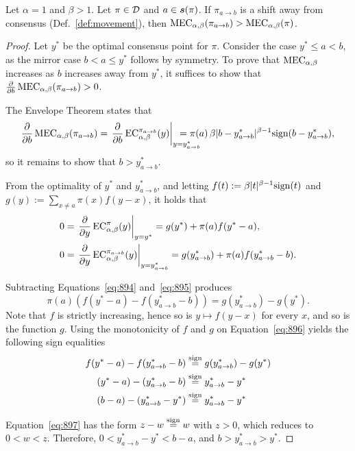 \begin{theorem}\label{thm:mec-increases-a1-b}
Let $\alpha = 1$ and $\beta>1$. Let $\pi\in\mathcal{D}$ and $a\in\boldsymbol{s}(\pi)$. If $\pi_{a\to b}$ is a shift away from consensus (Def.~\ref{def:movement}), then $\MEC(\pi_{a\to b})>\MEC(\pi)$.
\end{theorem}
\begin{proof}
Let $y^*$ be the optimal consensus point for $\pi$.
Consider the case $y^*\le a<b$, as the mirror case $b<a\le y^*$ follows by symmetry.
To prove that $\MEC$ increases as $b$ increases away from $y^*$, it suffices to show that $\frac{\partial}{\partial b} \MEC(\pi_{a\to b})>0$.

The Envelope Theorem states that
\[
\frac{\partial}{\partial b} \MEC(\pi_{a\to b})
=\left.\frac{\partial}{\partial b} \EC[\alpha,\beta][\pi_{a\to b}](y)\right|_{y=y^*_{a\to b}}\hspace{-2.5em} = \pi(a)\, \beta |b-y^*_{a\to b}|^{\beta-1} \sign(b-y^*_{a\to b}),
\]
so it remains to show that $b > y^*_{a\to b}$.

From the optimality of $y^*$ and $y^*_{a\to b}$, and letting $f(t):=\beta |t|^{\beta-1} {\textrm{sign}}(t)$ and  $g(y) := \sum_{x \ne a} \pi(x) f(y-x)$, it holds that
\begin{align}
0 &= \left.\frac{\partial}{\partial y} \EC[\alpha,\beta][\pi](y)\right|_{y=y^*}
= g(y^*) + \pi(a) f(y^*-a),\label{eq:894}\\
0 &= \left.\frac{\partial}{\partial y} \EC[\alpha,\beta][\pi_{a\to b}](y)\right|_{y=y^*_{a\to b}}
= g(y^*_{a\to b}) + \pi(a) f(y^*_{a\to b}-b).\label{eq:895}
\end{align}

Subtracting Equations~\eqref{eq:894} and~\eqref{eq:895} produces
\begin{equation}
\pi(a) (f(y^*-a) - f(y^*_{a\to b}-b)) = g(y^*_{a\to b}) - g(y^*).
\label{eq:896}
\end{equation}
Note that $f$ is strictly increasing, hence so is $y\mapsto f(y-x)$ for every $x$, and so is the function $g$.
Using the monotonicity of $f$ and $g$ on Equation~\eqref{eq:896} yields the following sign equalities
\def\eqsign{\stackrel{\sign}{=}}
\begin{align}
    f(y^*-a) - f(y^*_{a\to b}-b) &\eqsign g(y^*_{a\to b}) - g(y^*)\nonumber\\
    (y^*-a) - (y^*_{a\to b}-b) &\eqsign y^*_{a\to b} - y^*\nonumber\\
    (b-a) - (y^*_{a\to b}-y^*) &\eqsign y^*_{a\to b} - y^*\label{eq:897}
\end{align}

Equation~\eqref{eq:897} has the form $z-w \eqsign w$ with $z>0$, which reduces to $0<w<z$. Therefore, $0 < y^*_{a\to b}-y^* < b-a$, and $b>y^*_{a\to b}>y^*$.
\end{proof}

